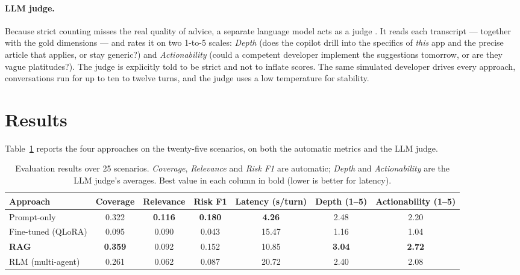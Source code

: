 \documentclass[11pt]{article}
\begin{document}
\paragraph{LLM judge.}
Because strict counting misses the real quality of advice, a separate language model acts
as a judge \citep{zheng2023judging}. It reads each transcript --- together with the gold
dimensions --- and rates it on two 1-to-5 scales: \emph{Depth} (does the copilot drill
into the specifics of \emph{this} app and the precise article that applies, or stay
generic?) and \emph{Actionability} (could a competent developer implement the suggestions
tomorrow, or are they vague platitudes?). The judge is explicitly told to be strict and
not to inflate scores. The same simulated developer drives every approach, conversations
run for up to ten to twelve turns, and the judge uses a low temperature for stability.

\section{Results}
\label{sec:results}

Table~\ref{tab:results} reports the four approaches on the twenty-five scenarios, on both
the automatic metrics and the LLM judge.

\begin{table}[t]
  \centering
  \footnotesize
  \setlength{\tabcolsep}{6pt}
  \begin{tabular}{|l|c|c|c|c|c|c|}
    \hline
    \textbf{Approach} & \textbf{Coverage} & \textbf{Relevance} & \textbf{Risk F1} &
    \textbf{Latency (s/turn)} & \textbf{Depth (1--5)} & \textbf{Actionability (1--5)} \\
    \hline
    Prompt-only & 0.322 & \textbf{0.116} & \textbf{0.180} & \textbf{4.26} & 2.48 & 2.20 \\
    \hline
    Fine-tuned (QLoRA) & 0.095 & 0.090 & 0.043 & 15.47 & 1.16 & 1.04 \\
    \hline
    \textbf{RAG} & \textbf{0.359} & 0.092 & 0.152 & 10.85 & \textbf{3.04} & \textbf{2.72} \\
    \hline
    RLM (multi-agent) & 0.261 & 0.062 & 0.087 & 20.72 & 2.40 & 2.08 \\
    \hline
  \end{tabular}
  \caption{Evaluation results over 25 scenarios. \emph{Coverage}, \emph{Relevance} and
  \emph{Risk F1} are automatic; \emph{Depth} and \emph{Actionability} are the LLM judge's
  averages. Best value in each column in bold (lower is better for latency).}
  \label{tab:results}
\end{table}
\end{document}
